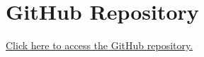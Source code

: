 \chapter{GitHub Repository}\label{app:c_github}
\href{https://github.com/zuhayrl/eee4022S_thesis}{Click here to access the GitHub repository.}

